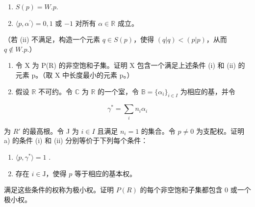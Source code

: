 \begin{enumerate}
\def\labelenumi{(\roman{enumi})}
\item
  \(S(p) = W.p.\)
\item
  \(\langle p, \alpha^{\prime} \rangle = 0, 1\) 或 \(-1\) 对所有 \(\alpha \in \mathbb{R}\) 成立。
\end{enumerate}

（若 (ii) 不满足，构造一个元素 \(q \in S(p)\)，使得 \((q|q) < (p|p)\)，从而 \(q \notin W.p.\)）

\begin{enumerate}
\def\labelenumi{\alph{enumi})}
\setcounter{enumi}{1}
\item
  令 X 为 P(R) 的非空饱和子集。证明 X 包含一个满足上述条件 (i) 和 (ii) 的元素 p。（取 X 中长度最小的元素 p。）
\item
  假设 \(\mathbb{R}\) 不可约。令 \(\mathbb{C}\) 为 \(\mathbb{R}\) 的一个室，令 \(\mathbb{B} = \{\alpha_i\}_{i\in I}\) 为相应的基，并令
\end{enumerate}

\[
\gamma^ {*} = \sum_ {i} n _ {i} \alpha_ {i}
\]

为 \(R'\) 的最高根。令 J 为 \(i \in I\) 且满足 \(n_{i} = 1\) 的集合。令 \(p \neq 0\) 为支配权。证明 a) 的条件 (i) 和 (ii) 分别等价于下列每个条件：

\begin{enumerate}
\def\labelenumi{(\roman{enumi})}
\setcounter{enumi}{2}
\item
  \(\langle p, \gamma^{*} \rangle = 1\) .
\item
  存在 \(i \in \mathrm{J}\)，使得 \(p\) 等于相应的基本权。
\end{enumerate}

满足这些条件的权称为极小权。证明 \(P(R)\) 的每个非空饱和子集都包含 0 或一个极小权。

